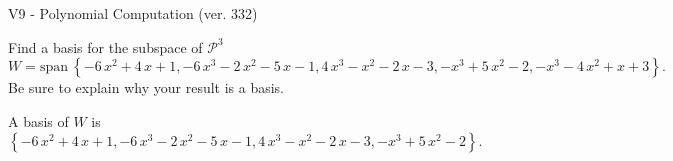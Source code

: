 \begin{exercise}
  \begin{exerciseTitle}V9 - Polynomial Computation (ver. 332)\end{exerciseTitle}
  \begin{exerciseStatement}
    Find a basis for the subspace of \(\mathcal{P}^3\) 
\[W=\mathrm{span}\ \left\{-6 \, x^{2} + 4 \, x + 1 , -6 \, x^{3} - 2 \, x^{2} - 5 \, x - 1 , 4 \, x^{3} - x^{2} - 2 \, x - 3 , -x^{3} + 5 \, x^{2} - 2 , -x^{3} - 4 \, x^{2} + x + 3\right\}.\]
 Be sure to explain why your result is a basis.


  \end{exerciseStatement}
  \begin{exerciseAnswer}
   A basis of \(W\) is  \(\left\{-6 \, x^{2} + 4 \, x + 1 , -6 \, x^{3} - 2 \, x^{2} - 5 \, x - 1 , 4 \, x^{3} - x^{2} - 2 \, x - 3 , -x^{3} + 5 \, x^{2} - 2\right\}\).
  


  \end{exerciseAnswer}
\end{exercise}